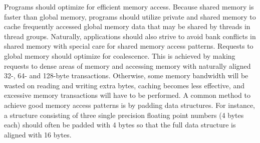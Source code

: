 Programs should optimize for efficient memory access. Because shared memory is faster than global memory, programs should utilize private and shared memory to cache frequently accessed global memory data that may be shared by threads in thread groups. Naturally, applications should also strive to avoid bank conflicts in shared memory with special care for shared memory access patterns. Requests to global memory should optimize for coalescence. This is achieved by making requests to dense areas of memory and accessing memory with naturally aligned 32-, 64- and 128-byte transactions. Otherwise, some memory bandwidth will be wasted on reading and writing extra bytes, caching becomes less effective, and excessive memory transactions will have to be performed. A common method to achieve good memory access patterns is by padding data structures. For instance, a structure consisting of three single precision floating point numbers (4 bytes each) should often be padded with 4 bytes so that the full data structure is aligned with 16 bytes.
